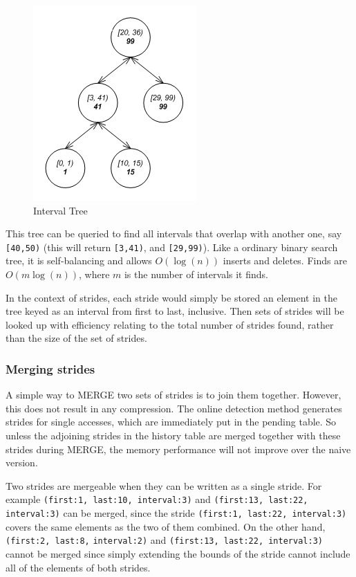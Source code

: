 \documentclass[12pt,twoside]{reedthesis}
\begin{document}
		\begin{figure}[h]
			\caption{Interval Tree}
			\label{fig:interval-tree}
			\includegraphics[scale=0.5]{interval-tree}
		\end{figure}
		
		This tree can be queried to find all intervals that overlap with another one, say \texttt{[40,50)} (this will return \texttt{[3,41)}, and \texttt{[29,99)}). Like a ordinary binary search tree, it is self-balancing and allows $O(\log(n))$ inserts and deletes. Finds are $O(m\log(n))$, where $m$ is the number of intervals it finds. 
		
		In the context of strides, each stride would simply be stored  an element in the tree keyed as an interval from first to last, inclusive. Then sets of strides will be looked up with efficiency relating to the total number of strides found, rather than the size of the set of strides. 
		
		\subsubsection{Merging strides}
		
		A simple way to MERGE two sets of strides is to join them together. However, this does not result in any compression. The online detection method generates strides for single accesses, which are immediately put in the pending table. So unless the adjoining strides in the history table are merged together with these strides during MERGE, the memory performance will not improve over the naive version. 
		
		Two strides are mergeable when they can be written as a single stride. For example \texttt{(first:1, last:10, interval:3)} and  \texttt{(first:13, last:22, interval:3)} can be merged, since the stride  \texttt{(first:1, last:22, interval:3)} covers the same elements as the two of them combined. On the other hand, \texttt{(first:2, last:8,} \linebreak\texttt{interval:2)} and \texttt{(first:13, last:22, interval:3)} cannot be merged since simply extending the bounds of the stride cannot include all of the elements of both strides.
		
\end{document}
